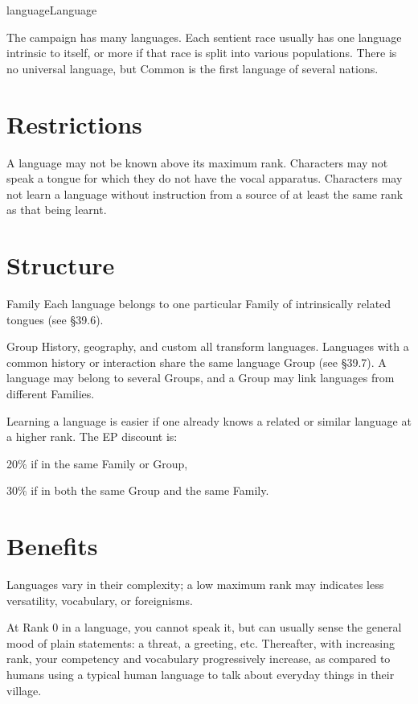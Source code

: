 \begin{Skill}[2.1]{language}{Language}

The campaign has many languages.  Each sentient race usually has one
language intrinsic to itself, or more if that race is split into
various populations.  There is no universal language, but Common is
the first language of several nations.

\section{Restrictions}

A language may not be known above its maximum rank. Characters may not
speak a tongue for which they do not have the vocal apparatus.
Characters may not learn a language without instruction from a source
of at least the same rank as that being learnt.

\section{Structure}
Family Each language belongs to one particular Family of intrinsically
related tongues (see §39.6).

Group History, geography, and custom all transform languages.
Languages with a common history or interaction share the same language
Group (see §39.7). A language may belong to several Groups, and a
Group may link languages from different Families.

Learning a language is easier if one already knows a related or
similar language at a higher rank. The EP discount is:

\begin{Itemize}

\item 20\% if in the same Family or Group,  

\item 30\% if in both the same Group and the same Family.

\end{Itemize}

\section{Benefits}

Languages vary in their complexity; a low maximum rank may indicates
less versatility, vocabulary, or foreignisms.

At Rank 0 in a language, you cannot speak it, but can usually sense
the general mood of plain statements: a threat, a greeting, etc.
Thereafter, with increasing rank, your competency and vocabulary
progressively increase, as compared to humans using a typical human
language to talk about everyday things in their village.


\end{Skill}
